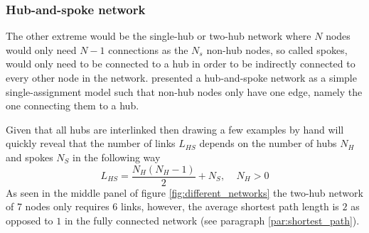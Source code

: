 \subsubsection{Hub-and-spoke network}
The other extreme would be the single-hub or two-hub network where $N$ nodes would only need $N-1$ connections as the $N_s$ non-hub nodes, so called spokes, would only need to be connected to a hub in order to be indirectly connected to every other node in the network. \citet{o1987quadratic} presented a hub-and-spoke network as a simple single-assignment model such that non-hub nodes only have one edge, namely the one connecting them to a hub.
\par
Given that all hubs are interlinked then drawing a few examples by hand will quickly reveal that the number of links $L_{HS}$ depends on the number of hubs $N_H$ and spokes $N_S$ in the following way
\begin{equation*}
  L_{HS}=\frac{N_H(N_H-1)}{2}+N_S,\ \ \ \ \ N_H>0
\end{equation*}
As seen in the middle panel of figure \ref{fig:different_networks} the two-hub network of 7 nodes only requires 6 links, however, the average shortest path length is $2$ as opposed to $1$ in the fully connected network (see paragraph \ref{par:shortest_path}).

